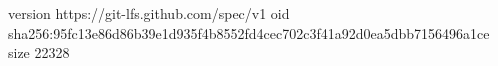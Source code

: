 version https://git-lfs.github.com/spec/v1
oid sha256:95fc13e86d86b39e1d935f4b8552fd4cec702c3f41a92d0ea5dbb7156496a1ce
size 22328
